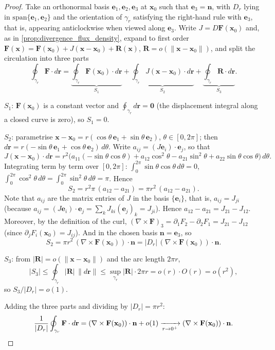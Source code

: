 \begin{proof}
Take an orthonormal basis $\mathbf e_1,\mathbf e_2,\mathbf e_3$ at $\mathbf x_0$ such that $\mathbf e_3 = \mathbf n$, with $D_r$ lying in $\mathrm{span}\{\mathbf e_1,\mathbf e_2\}$ and the orientation of $\gamma_r$ satisfying the right-hand rule with $\mathbf e_3$, that is, appearing anticlockwise when viewed along $\mathbf e_3$. Write $J = D\mathbf F(\mathbf x_0)$ and, as in \cref{prop:divergence_flux_density}, expand to first order
$\mathbf F(\mathbf x) = \mathbf F(\mathbf x_0)+J(\mathbf x-\mathbf x_0)+\mathbf R(\mathbf x)$, $\mathbf R = o(\|\mathbf x-\mathbf x_0\|)$, and split the circulation into three parts
\[
\oint_{\gamma_r}\mathbf F\cdot d\mathbf r
= \underbrace{\oint_{\gamma_r}\mathbf F(\mathbf x_0)\cdot d\mathbf r}_{S_1}
+ \underbrace{\oint_{\gamma_r} J(\mathbf x-\mathbf x_0)\cdot d\mathbf r}_{S_2}
+ \underbrace{\oint_{\gamma_r}\mathbf R\cdot d\mathbf r}_{S_3}.
\]

\textbf{$S_1$}: $\mathbf F(\mathbf x_0)$ is a constant vector and $\oint_{\gamma_r}d\mathbf r = \mathbf 0$ (the displacement integral along a closed curve is zero), so $S_1 = 0$.

\textbf{$S_2$}: parametrise $\mathbf x-\mathbf x_0 = r(\cos\theta\,\mathbf e_1+\sin\theta\,\mathbf e_2)$, $\theta\in[0,2\pi]$; then $d\mathbf r = r(-\sin\theta\,\mathbf e_1+\cos\theta\,\mathbf e_2)\,d\theta$. Write $a_{ij} = (J\mathbf e_i)\cdot\mathbf e_j$, so that
\[
J(\mathbf x-\mathbf x_0)\cdot d\mathbf r
= r^2\bigl(a_{11}(-\sin\theta\cos\theta) + a_{12}\cos^2\theta - a_{21}\sin^2\theta + a_{22}\sin\theta\cos\theta\bigr)\,d\theta .
\]
Integrating term by term over $[0,2\pi]$: $\int_0^{2\pi}\sin\theta\cos\theta\,d\theta = 0$, $\int_0^{2\pi}\cos^2\theta\,d\theta = \int_0^{2\pi}\sin^2\theta\,d\theta = \pi$. Hence
\[
S_2 = r^2\pi\,(a_{12}-a_{21}) = \pi r^2\,(a_{12}-a_{21}).
\]
Note that $a_{ij}$ are the matrix entries of $J$ in the basis $\{\mathbf e_i\}$, that is, $a_{ij} = J_{ji}$ (because $a_{ij}=(J\mathbf e_i)\cdot\mathbf e_j = \sum_k J_{ki}(\mathbf e_j)_k = J_{ji}$). Hence $a_{12}-a_{21} = J_{21}-J_{12}$. Moreover, by the definition of the curl, $(\nabla\times\mathbf F)_3 = \partial_1F_2-\partial_2F_1 = J_{21}-J_{12}$ (since $\partial_jF_i(\mathbf x_0)=J_{ij}$). And in the chosen basis $\mathbf n = \mathbf e_3$, so
\[
S_2 = \pi r^2\,(\nabla\times\mathbf F(\mathbf x_0))\cdot\mathbf n = |D_r|\,(\nabla\times\mathbf F(\mathbf x_0))\cdot\mathbf n .
\]

\textbf{$S_3$}: from $|\mathbf R|=o(\|\mathbf x-\mathbf x_0\|)$ and the arc length $2\pi r$,
\[
|S_3| \le \oint_{\gamma_r}|\mathbf R|\,\|d\mathbf r\| \le \sup_{\gamma_r}|\mathbf R|\cdot 2\pi r = o(r)\cdot O(r) = o(r^2),
\]
so $S_3/|D_r| = o(1)$.

Adding the three parts and dividing by $|D_r|=\pi r^2$:
\[
\frac{1}{|D_r|}\oint_{\gamma_r}\mathbf F\cdot d\mathbf r
= (\nabla\times\mathbf F(\mathbf x_0))\cdot\mathbf n + o(1)\xrightarrow[r\to0^+]{}(\nabla\times\mathbf F(\mathbf x_0))\cdot\mathbf n. \qedhere
\]
\end{proof}

